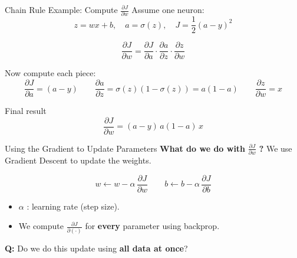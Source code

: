 \begin{frame}{Chain Rule Example: Compute $\frac{\partial J}{\partial w}$}
Assume one neuron:
\[
z=wx+b,\quad a=\sigma(z),\quad J=\frac{1}{2}(a-y)^2
\]

\begin{tcolorbox}[colback=yellow!8, colframe=orange!70, title=\textbf{Chain Rule (backprop)}]
\[
\frac{\partial J}{\partial w}
=
\frac{\partial J}{\partial a}
\cdot
\frac{\partial a}{\partial z}
\cdot
\frac{\partial z}{\partial w}
\]
\end{tcolorbox}

\vspace{0.5em}
Now compute each piece:
\[
\frac{\partial J}{\partial a} = (a-y)
\qquad
\frac{\partial a}{\partial z} = \sigma(z)(1-\sigma(z)) = a(1-a)
\qquad
\frac{\partial z}{\partial w} = x
\]

\begin{block}{Final result}
\[
\boxed{
\frac{\partial J}{\partial w} = (a-y)\,a(1-a)\,x
}
\]
\end{block}
\end{frame}

\begin{frame}{Using the Gradient to Update Parameters}
\textbf{What do we do with } $\frac{\partial J}{\partial w}$ \textbf{?}  
We use Gradient Descent to update the weights.

\vspace{0.8em}
\begin{tcolorbox}[colback=green!6, colframe=green!50!black, title=\textbf{Parameter Update Rule (via Gradient Descent)}]
\[
w \leftarrow w - \alpha \,\frac{\partial J}{\partial w}
\qquad
b \leftarrow b - \alpha \,\frac{\partial J}{\partial b}
\]
\end{tcolorbox}

\vspace{0.6em}
\small
\begin{itemize}
    \item $\alpha$ : learning rate (step size).
    \item We compute $\frac{\partial J}{\partial(\cdot)}$ for \textbf{every} parameter using backprop.
\end{itemize}

\pause
\begin{tcolorbox}[colback=yellow!8, colframe=orange!70, arc=8pt]
\centering
\textbf{Q:}
Do we do this update using \textbf{all data at once}?
\end{tcolorbox}
\end{frame}





